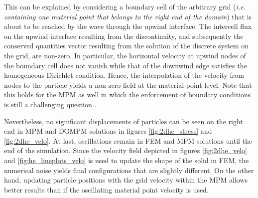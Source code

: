This can be explained by considering a boundary cell of the arbitrary grid (\textit{i.e. containing one material point that belongs to the right end of the domain}) that is about to be reached by the wave through the upwind interface.
The intercell flux on the upwind interface resulting from the discontinuity, and subsequently the conserved quantities vector resulting from the solution of the discrete system on the grid, are non-zero.
In particular, the horizontal velocity at upwind nodes of the boundary cell does not vanish while that of the downwind edge satisfies the homogeneous Dirichlet condition. 
Hence, the interpolation of the velocity from nodes to the particle yields a non-zero field at the material point level.
Note that this holds for the MPM as well in which the enforcement of boundary conditions is still a challenging question \cite{BC_MPM}.

Nevertheless, no significant displacements of particles can be seen on the right end in MPM and DGMPM solutions in figures \ref{fig:2dhe_stress} and \ref{fig:2dhe_velo}.
At last, oscillations remain in FEM and MPM solutions until the end of the simulation. 
Since the velocity field depicted in figures \ref{fig:2dhe_velo} and \ref{fig:he_lineplots_velo} is used to update the shape of the solid in FEM, the numerical noise yields final configurations that are slightly different.
On the other hand, updating particle positions with the grid velocity within the MPM allows better results than if the oscillating material point velocity is used.


